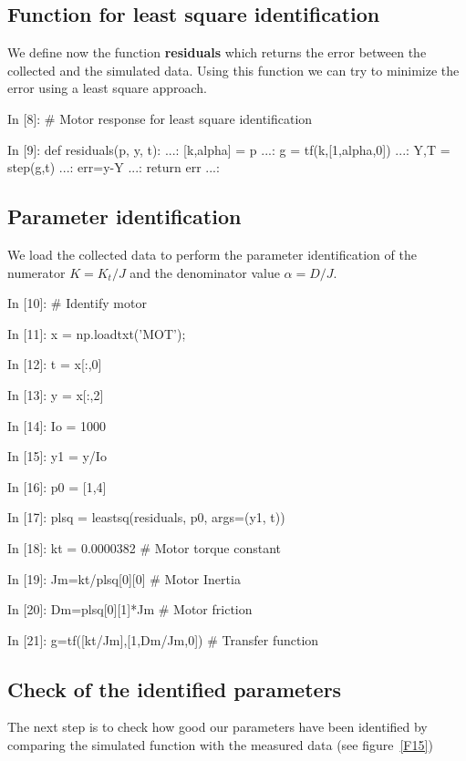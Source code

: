 \subsection{Function for least square identification}
We define now the function \textbf{residuals} which returns the error between 
the collected and the simulated data. 
Using this function we can try to minimize the error using a least square 
approach.

\begin{code}
In [8]: # Motor response for least square identification

In [9]: def residuals(p, y, t):  
   ...:     [k,alpha] = p
   ...:     g = tf(k,[1,alpha,0])
   ...:     Y,T = step(g,t)
   ...:     err=y-Y
   ...:     return err
   ...: 
\end{code}

\subsection{Parameter identification}
We load the collected data to perform the parameter identification of the 
numerator $K=K_t/J$ and the  denominator value $\alpha=D/J$.

\begin{code}
In [10]: # Identify motor

In [11]: x = np.loadtxt('MOT');

In [12]: t = x[:,0]

In [13]: y = x[:,2] 

In [14]: Io = 1000

In [15]: y1 = y/Io

In [16]: p0 = [1,4]

In [17]: plsq = leastsq(residuals, p0, args=(y1, t))

In [18]: kt = 0.0000382          # Motor torque constant

In [19]: Jm=kt/plsq[0][0]        # Motor Inertia

In [20]: Dm=plsq[0][1]*Jm        # Motor friction

In [21]: g=tf([kt/Jm],[1,Dm/Jm,0])  # Transfer function
\end{code}

\subsection{Check of the identified parameters}

The next step is to check how good our parameters have been identified by 
comparing the simulated function with the measured data (see figure~\ref{F15})

